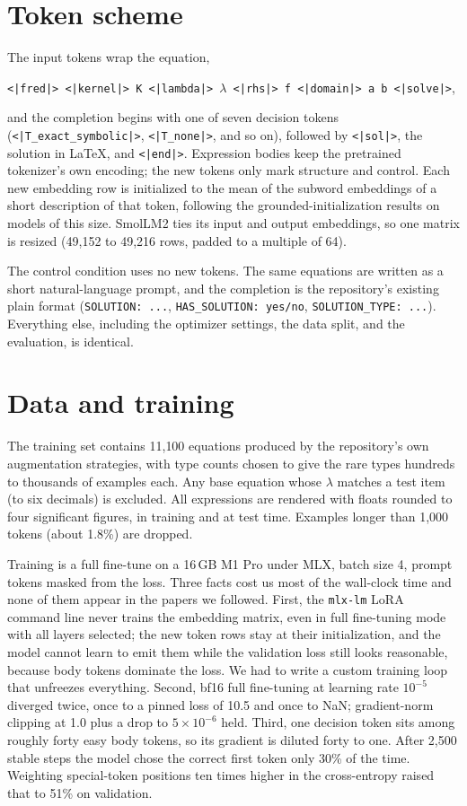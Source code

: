 \documentclass[11pt]{article}
\begin{document}
\section{Token scheme}
The input tokens wrap the equation,
\begin{center}
\texttt{<|fred|> <|kernel|> K <|lambda|> $\lambda$ <|rhs|> f <|domain|> a b <|solve|>},
\end{center}
and the completion begins with one of seven decision tokens
(\texttt{<|T\_exact\_symbolic|>}, \texttt{<|T\_none|>}, and so on), followed by
\texttt{<|sol|>}, the solution in LaTeX, and \texttt{<|end|>}. Expression
bodies keep the pretrained tokenizer's own encoding; the new tokens only mark
structure and control. Each new embedding row is initialized to the mean of
the subword embeddings of a short description of that token, following the
grounded-initialization results on models of this size. SmolLM2 ties its input
and output embeddings, so one matrix is resized (49{,}152 to 49{,}216 rows,
padded to a multiple of 64).

The control condition uses no new tokens. The same equations are written as a
short natural-language prompt, and the completion is the repository's existing
plain format (\texttt{SOLUTION:~...}, \texttt{HAS\_SOLUTION:~yes/no},
\texttt{SOLUTION\_TYPE:~...}). Everything else, including the optimizer
settings, the data split, and the evaluation, is identical.

\section{Data and training}
The training set contains 11{,}100 equations produced by the repository's own
augmentation strategies, with type counts chosen to give the rare types
hundreds to thousands of examples each. Any base equation whose $\lambda$
matches a test item (to six decimals) is excluded. All expressions are
rendered with floats rounded to four significant figures, in training and at
test time. Examples longer than 1{,}000 tokens (about 1.8\%) are dropped.

Training is a full fine-tune on a 16\,GB M1 Pro under MLX, batch size 4,
prompt tokens masked from the loss. Three facts cost us most of the wall-clock
time and none of them appear in the papers we followed. First, the
\texttt{mlx-lm} LoRA command line never trains the embedding matrix, even in
full fine-tuning mode with all layers selected; the new token rows stay at
their initialization, and the model cannot learn to emit them while the
validation loss still looks reasonable, because body tokens dominate the loss.
We had to write a custom training loop that unfreezes everything. Second,
bf16 full fine-tuning at learning rate $10^{-5}$ diverged twice, once to a
pinned loss of 10.5 and once to NaN; gradient-norm clipping at 1.0 plus a drop
to $5\times10^{-6}$ held. Third, one decision token sits among roughly forty
easy body tokens, so its gradient is diluted forty to one. After 2{,}500
stable steps the model chose the correct first token only 30\% of the time.
Weighting special-token positions ten times higher in the cross-entropy
raised that to 51\% on validation.
\end{document}
